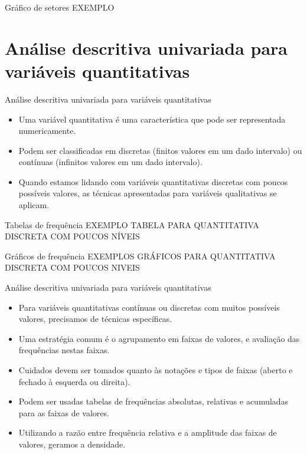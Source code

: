 \documentclass[
  ignorenonframetext,
  serif,
  professionalfont,
  usenames,
  dvipsnames,
  aspectratio = 169]{beamer}
\begin{document}
\begin{frame}{Gráfico de setores}
\protect\hypertarget{gruxe1fico-de-setores-1}{}
EXEMPLO
\end{frame}

\hypertarget{anuxe1lise-descritiva-univariada-para-variuxe1veis-quantitativas}{%
\section{Análise descritiva univariada para variáveis
quantitativas}\label{anuxe1lise-descritiva-univariada-para-variuxe1veis-quantitativas}}

\begin{frame}{Análise descritiva univariada para variáveis
quantitativas}
\protect\hypertarget{anuxe1lise-descritiva-univariada-para-variuxe1veis-quantitativas-1}{}
\begin{itemize}
\item
  Uma variável quantitativa é uma característica que pode ser
  representada numericamente.
\item
  Podem ser classificadas em discretas (finitos valores em um dado
  intervalo) ou contínuas (infinitos valores em um dado intervalo).
\item
  Quando estamos lidando com variáveis quantitativas discretas com
  poucos possíveis valores, as técnicas apresentadas para variáveis
  qualitativas se aplicam.
\end{itemize}
\end{frame}

\begin{frame}{Tabelas de frequência}
\protect\hypertarget{tabelas-de-frequuxeancia}{}
EXEMPLO TABELA PARA QUANTITATIVA DISCRETA COM POUCOS NÍVEIS
\end{frame}

\begin{frame}{Gráficos de frequência}
\protect\hypertarget{gruxe1ficos-de-frequuxeancia}{}
EXEMPLOS GRÁFICOS PARA QUANTITATIVA DISCRETA COM POUCOS NIVEIS
\end{frame}

\begin{frame}{Análise descritiva univariada para variáveis
quantitativas}
\protect\hypertarget{anuxe1lise-descritiva-univariada-para-variuxe1veis-quantitativas-2}{}
\begin{itemize}
\item
  Para variáveis quantitativas contínuas ou discretas com muitos
  possíveis valores, precisamos de técnicas específicas.
\item
  Uma estratégia comum é o agrupamento em faixas de valores, e avaliação
  das frequências nestas faixas.
\item
  Cuidados devem ser tomados quanto às notações e tipos de faixas
  (aberto e fechado à esquerda ou direita).
\item
  Podem ser usadas tabelas de frequências absolutas, relativas e
  acumuladas para as faixas de valores.
\item
  Utilizando a razão entre frequência relativa e a amplitude das faixas
  de valores, geramos a densidade.
\end{itemize}
\end{frame}
\end{document}
